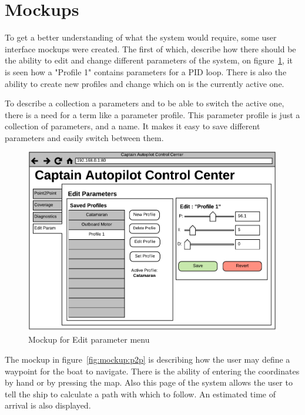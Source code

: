 \section{Mockups}
\label{sec:mockups}
To get a better understanding of what the system would require, some user interface mockups were created. 
The first of which, describe how there should be the ability to edit and change different parameters of the system, on figure~\ref{fig:mockup:edit_param}, it is seen how a "Profile 1" contains parameters for a PID loop. There is also the ability to create new profiles and change which on is the currently active one.

To describe a collection a parameters and to be able to switch the active one, there is a need for a term like a parameter profile.
This parameter profile is just a collection of parameters, and a name. It makes it easy to save different parameters and easily switch between them.

\begin{figure}[H]
	\centering
	\includegraphics[width=1\linewidth]{Images/Requirements_specification/UI_Mockup_Edit_param.pdf}
	\caption{Mockup for Edit parameter menu}
	\label{fig:mockup:edit_param}
\end{figure}

The mockup in figure~\ref{fig:mockup:p2p} is describing how the user may define a waypoint for the boat to navigate. There is the ability of entering the coordinates by hand or by pressing the map. Also this page of the system allows the user to tell the ship to calculate a path with which to follow. An estimated time of arrival is also displayed.


